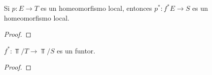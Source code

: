 \begin{lema}\label{Lem 2.5.5}
    Si $p\colon E\to T$ es un homeomorfismo local, entonces $p^*\colon f^*E\to S$ es un homeomorfismo local.
\end{lema}

\begin{proof}

\end{proof}

\begin{lema}\label{Lem 2.5.6}
$f^*\colon \Top/T\to \Top/S$ es un funtor.
\end{lema}

\begin{proof}

\end{proof}
